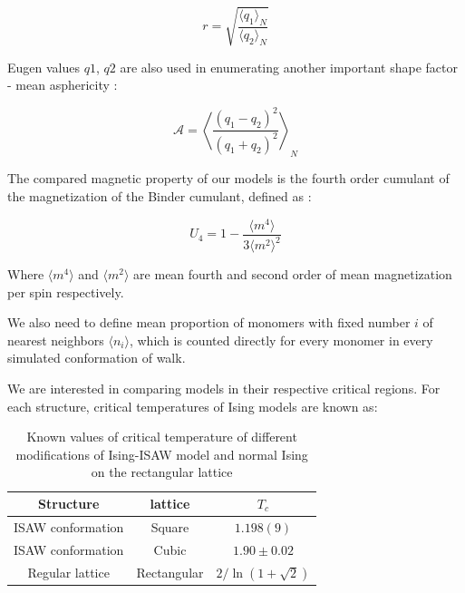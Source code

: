 \documentclass[a4paper]{jpconf}
\begin{document}
\begin{equation}
    r = \sqrt{\frac{\langle q_{1}\rangle_{N}}{\langle q_{2} \rangle_{N}}}
\end{equation}

Eugen values $q1$, $q2$ are also used in enumerating another important shape factor - mean asphericity \cite{Caracciolo2011}:

\begin{equation}
\label{eq:Asphericity}
    \mathcal{A} = \left\langle \frac{(q_{1} - q_{2})^{2}}{(q_{1} + q_{2})^{2}} \right\rangle_{N}
\end{equation}

The compared magnetic property of our models is the fourth order cumulant of the magnetization of the Binder cumulant, defined as \cite{Binder1981_Ising}:

\begin{equation}
\label{eq:Cumulant}
U_{4} = 1 - \frac{\langle m^{4} \rangle}{3 \langle m^{2} \rangle^{2}}
\end{equation}

Where $\langle m^{4} \rangle$ and $\langle m^{2} \rangle$ are mean fourth and second order of mean magnetization per spin respectively.

We also need to define mean proportion of monomers with fixed number $i$ of nearest neighbors $\langle n_{i} \rangle$, which is counted directly for every monomer in every simulated conformation of walk.

We are interested in comparing models in their respective critical regions. For each structure, critical temperatures of Ising models are known as:

\begin{table}[h]
    \centering
    \begin{tabular}{|c|c|c|}
        \hline
        Structure & lattice & $T_{c}$ \\ \hline
        ISAW conformation & Square & $1.198(9)$\cite{faizullina2021critical} \\ \hline
        ISAW conformation & Cubic & $1.90 \pm 0.02$\cite{Foster2021}\\ \hline
        Regular lattice & Rectangular & $2/\ln{(1 + \sqrt{2})}$\cite{Onsager}\\ \hline
    \end{tabular}
    \caption{Known values of critical temperature of different modifications of Ising-ISAW model and normal Ising on the rectangular lattice}
    \label{tab:Ising_T_c}
\end{table}
\end{document}

